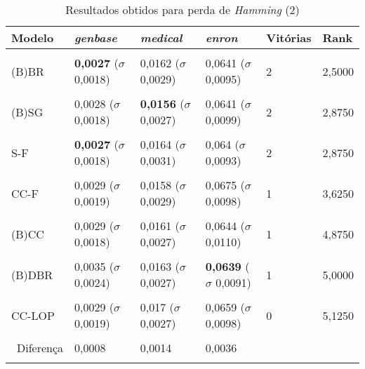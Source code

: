 \begin{table}[htbp]
	\centering
	\caption{Resultados obtidos para perda de \textit{{Hamming}} (2)}
		\begin{tabular}
        { p{0.88in} p{0.88in} p{0.88in} p{0.88in} p{0.88in} p{0.88in} }
        
        \hline
Modelo & \textit{genbase} & \textit{medical} & \textit{enron} & \textbf{Vitórias} & \textbf{Rank} \\ 
\hline \\

(B)BR & \textbf{0,0027} \newline ($\sigma$ 0,0018) & 0,0162 \newline ($\sigma$ 0,0029) & 0,0641 \newline ($\sigma$ 0,0095) & 2 & 2,5000 \\ \\
(B)SG & 0,0028 \newline ($\sigma$ 0,0018) & \textbf{0,0156} \newline ($\sigma$ 0,0027) & 0,0641 \newline ($\sigma$ 0,0099) & 2 & 2,8750 \\ \\
S-F & \textbf{0,0027} \newline ($\sigma$ 0,0018) & 0,0164 \newline ($\sigma$ 0,0031) & 0,064 \newline ($\sigma$ 0,0093) & 2 & 2,8750 \\ \\
CC-F & 0,0029 \newline ($\sigma$ 0,0019) & 0,0158 \newline ($\sigma$ 0,0029) & 0,0675 \newline ($\sigma$ 0,0098) & 1 & 3,6250 \\ \\
(B)CC & 0,0029 \newline ($\sigma$ 0,0018) & 0,0161 \newline ($\sigma$ 0,0027) & 0,0644 \newline ($\sigma$ 0,0110) & 1 & 4,8750 \\ \\
(B)DBR & 0,0035 \newline ($\sigma$ 0,0024) & 0,0163 \newline ($\sigma$ 0,0027) & \textbf{0,0639} \newline ($\sigma$ 0,0091) & 1 & 5,0000 \\ \\
CC-LOP & 0,0029 \newline ($\sigma$ 0,0019) & 0,017 \newline ($\sigma$ 0,0027) & 0,0659 \newline ($\sigma$ 0,0098) & 0 & 5,1250 \\ \\

\hline \ 
 Diferença & 0,0008 & 0,0014 & 0,0036 &  &  \\ 
\hline \\

        \end{tabular}
	\label{tab:metricsForHammingLoss_2}
\end{table}
